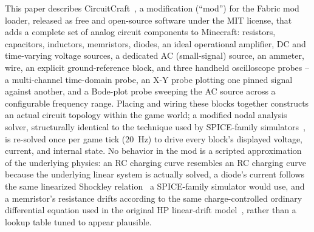 This paper describes CircuitCraft~\cite{picos2026circuitcraft}, a modification
(``mod'') for the Fabric mod loader, released as free and open-source software under the MIT
license, that adds a complete set of analog circuit components to Minecraft: resistors,
capacitors, inductors, memristors, diodes, an ideal operational amplifier, DC and
time-varying voltage sources, a dedicated AC (small-signal) source, an ammeter, wire, an
explicit ground-reference block, and three handheld oscilloscope probes -- a multi-channel
time-domain probe, an X-Y probe plotting one pinned signal against another, and a Bode-plot
probe sweeping the AC source across a configurable frequency range. Placing and wiring these blocks
together constructs an actual circuit topology within the game world; a modified nodal
analysis solver, structurally identical to the technique used by SPICE-family
simulators~\cite{ho1975mna}, is re-solved once per game tick (20~Hz) to drive every block's
displayed voltage, current, and internal state. No behavior in the mod is a scripted
approximation of the underlying physics: an RC charging curve resembles an RC charging curve
because the underlying linear system is actually solved, a diode's current follows the same
linearized Shockley relation~\cite{shockley1949diode} a SPICE-family simulator would use, and
a memristor's resistance drifts according to the same charge-controlled ordinary differential
equation used in the original HP linear-drift model~\cite{strukov2008missing}, rather than a
lookup table tuned to appear plausible.

